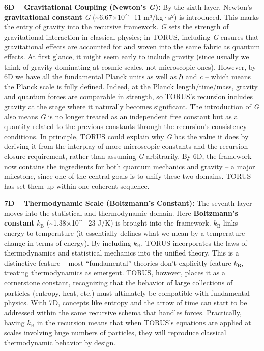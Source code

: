 \documentclass[]{article}
\newcommand{\subscript}[1]{\ensuremath{_{\mathrm{#1}}}}
\begin{document}
\textbf{6D -- Gravitational Coupling (Newton's \emph{G}):} By the sixth
layer, Newton's \textbf{gravitational constant} \emph{G}
(\textasciitilde{}6.67×10\^{}−11 m³/kg·s²) is introduced. This marks the
entry of gravity into the recursive framework. \emph{G} sets the
strength of gravitational interaction in classical physics; in TORUS,
including \emph{G} ensures that gravitational effects are accounted for
and woven into the same fabric as quantum effects. At first glance, it
might seem early to include gravity (since usually we think of gravity
dominating at cosmic scales, not microscopic ones). However, by 6D we
have all the fundamental Planck units as well as ℏ and \emph{c} -- which
means the Planck scale is fully defined. Indeed, at the Planck
length/time/mass, gravity and quantum forces are comparable in strength,
so TORUS's recursion includes gravity at the stage where it naturally
becomes significant. The introduction of \emph{G} also means \emph{G} is
no longer treated as an independent free constant but as a quantity
related to the previous constants through the recursion's consistency
conditions. In principle, TORUS could explain why \emph{G} has the value
it does by deriving it from the interplay of more microscopic constants
and the recursion closure requirement, rather than assuming \emph{G}
arbitrarily. By 6D, the framework now contains the ingredients for both
quantum mechanics and gravity -- a major milestone, since one of the
central goals is to unify these two domains. TORUS has set them up
within one coherent sequence.

\textbf{7D -- Thermodynamic Scale (Boltzmann's Constant):} The seventh
layer moves into the statistical and thermodynamic domain. Here
\textbf{Boltzmann's constant}
$k\subscript{B}$ (\textasciitilde{}1.38×10\^{}−23 J/K) is brought into the framework.
$k\subscript{B}$ links
energy to temperature (it essentially defines what we mean by a
temperature change in terms of energy). By including
$k\subscript{B}$,
TORUS incorporates the laws of thermodynamics and statistical mechanics
into the unified theory. This is a distinctive feature -- most
``fundamental'' theories don't explicitly feature
$k\subscript{B}$,
treating thermodynamics as emergent. TORUS, however, places it as a
cornerstone constant, recognizing that the behavior of large collections
of particles (entropy, heat, etc.) must ultimately be compatible with
fundamental physics. With 7D, concepts like entropy and the arrow of
time can start to be addressed within the same recursive schema that
handles forces. Practically, having
$k\subscript{B}$ in
the recursion means that when TORUS's equations are applied at scales
involving huge numbers of particles, they will reproduce classical
thermodynamic behavior by design.
\end{document}
